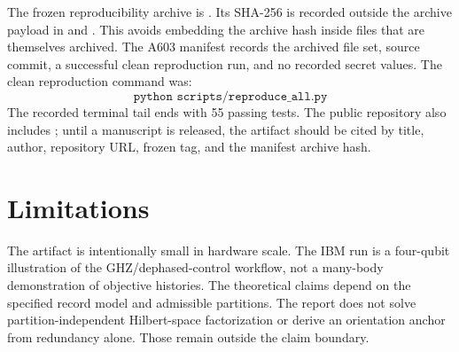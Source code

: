\documentclass[11pt]{article}
\begin{document}
The frozen reproducibility archive is
.  Its SHA-256 is recorded
outside the archive payload in
 and
.  This avoids embedding the archive hash inside
files that are themselves archived.  The A603 manifest records the archived
file set, source commit, a successful clean reproduction run, and no recorded
secret values.  The clean reproduction command was:
\[
  \texttt{python scripts/reproduce\_all.py}
\]
The recorded terminal tail ends with 55 passing tests.  The public repository
also includes ; until a manuscript is released, the artifact
should be cited by title, author, repository URL, frozen tag, and the manifest
archive hash.

\section{Limitations}

The artifact is intentionally small in hardware scale.  The IBM run is a
four-qubit illustration of the GHZ/dephased-control workflow, not a many-body
demonstration of objective histories.  The theoretical claims depend on the
specified record model and admissible partitions.  The report does not solve
partition-independent Hilbert-space factorization or derive an orientation
anchor from redundancy alone.  Those remain outside the claim boundary.



\end{document}
